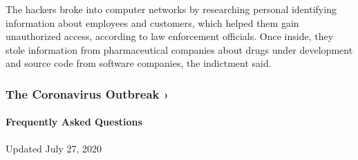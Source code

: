 The hackers broke into computer networks by researching personal
identifying information about employees and customers, which helped them
gain unauthorized access, according to law enforcement officials. Once
inside, they stole information from pharmaceutical companies about drugs
under development and source code from software companies, the
indictment said.

\href{https://www.nytimes.com/news-event/coronavirus?action=click\&pgtype=Article\&state=default\&region=MAIN_CONTENT_3\&context=storylines_faq}{}

\hypertarget{the-coronavirus-outbreak-}{%
\subsubsection{The Coronavirus Outbreak
›}\label{the-coronavirus-outbreak-}}

\hypertarget{frequently-asked-questions}{%
\paragraph{Frequently Asked
Questions}\label{frequently-asked-questions}}

Updated July 27, 2020

